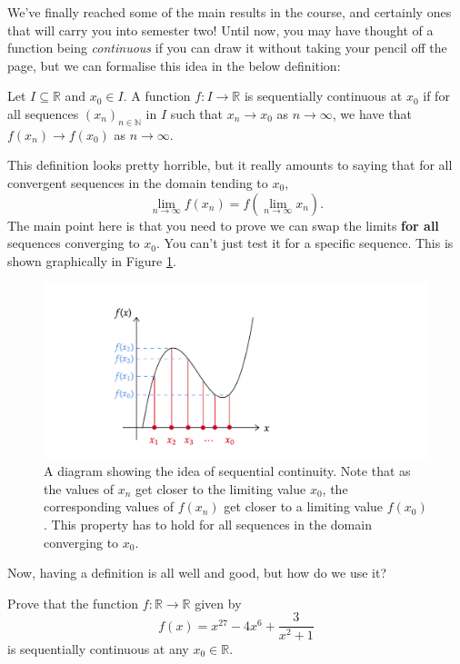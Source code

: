 \documentclass[
  17pt,
  a4paper]{extarticle}
\theoremstyle{plain}
\theoremstyle{plain}
\theoremstyle{plain}
\theoremstyle{plain}
\theoremstyle{plain}
\theoremstyle{definition}
\theoremstyle{definition}
\theoremstyle{definition}
\theoremstyle{remark}
\let\BeginKnitrBlock\begin \let\EndKnitrBlock\end
\renewcommand{\;}{\,}
\begin{document}
We've finally reached some of the main results in the course, and certainly ones that will carry you into semester two! Until now, you may have thought of a function being \emph{continuous} if you can draw it without taking your pencil off the page, but we can formalise this idea in the below definition:

\BeginKnitrBlock{definition}[Sequential Continuity]
{\label{def:def2} }Let \(I \subseteq \mathbb{R}\) and \(x_0 \in I\). A function \(f: I \to \mathbb{R}\) is sequentially continuous at \(x_0\) if for all sequences \((x_n)_{n\in\mathbb{N}}\) in \(I\) such that \(x_n \to x_0\) as \(n \to \infty\), we have that \(f(x_n) \to f(x_0)\) as \(n \to \infty\).
\EndKnitrBlock{definition}
This definition looks pretty horrible, but it really amounts to saying that for all convergent sequences in the domain tending to \(x_0\), \[\lim_{n\to\infty}f(x_n) = f\left(\lim_{n\to\infty}x_n\right).\] The main point here is that you need to prove we can swap the limits \textbf{for all} sequences converging to \(x_0.\) You can't just test it for a specific sequence. This is shown graphically in Figure \ref{fig:seqcnt}.

\begin{figure}
\includegraphics[width=\Width,height=\Height]{Seqcnt} \caption{A diagram showing the idea of sequential continuity. Note that as the values of $x_n$ get closer to the limiting value $x_0$, the corresponding values of $f(x_n)$ get closer to a limiting value $f(x_0)$. This property has to hold for all sequences in the domain converging to $x_0$.}\label{fig:seqcnt}
\end{figure}

Now, having a definition is all well and good, but how do we use it?
\BeginKnitrBlock{example}
{\label{exm:ex1} }Prove that the function \(f: \mathbb{R} \to \mathbb{R}\) given by \[f(x) = x^{27} - 4x^6 + \frac{3}{x^2 +1}\] is sequentially continuous at any \(x_0 \in \mathbb{R}\).
\EndKnitrBlock{example}
\end{document}
